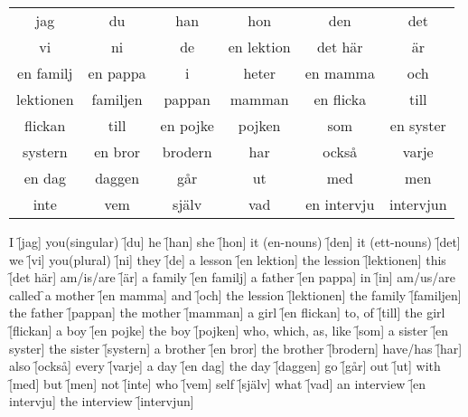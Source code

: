 \begin{center}
    \begin{tabular}{|c c c c c c|}
        \hline
        jag & du & han & hon & den & det \\
        vi & ni & de & en lektion & det här & är \\
        en familj & en pappa & i & heter & en mamma & och \\
        lektionen  & familjen & pappan & mamman & en flicka & till \\
        flickan & till & en pojke & pojken & som & en syster \\
        systern & en bror & brodern & har & också & varje \\
        en dag & daggen & går & ut &  med  &  men \\
        inte & vem & själv & vad & en intervju & intervjun \\
        \hline
    \end{tabular}
\end{center}

\begin{questions}
    \begin{multicols}{2}
        \raggedcolumns
        \question I \f[jag]
        \question you(singular) \f[du]
        \question he \f[han]
        \question she \f[hon]
        \question it (en-nouns) \f[den]
        \question it (ett-nouns) \f[det]
        \question we \f[vi]
        \question you(plural) \f[ni]
        \question they \f[de]
        \question a lesson \f[en lektion]
        \question the lession \f[lektionen]
        \question this \f[det här]
        \question am/is/are \f[är]
        \question a family \f[en familj]
        \question a father \f[en pappa]
        \question in \f[in]
        \question am/us/are called \f
        \question a mother \f[en mamma]
        \question and \f[och]
        \question the lession \f[lektionen]
        \question the family \f[familjen]
        \question the father \f[pappan]
        \question the mother \f[mamman]
        \question a girl \f[en flickan]
        \question to, of \f[till]
        \question the girl \f[flickan]
        \question a boy \f[en pojke]
        \question the boy \f[pojken]
        \question who, which, as, like \f[som]
        \question a sister \f[en syster]
        \question the sister \f[systern]
        \question a brother \f[en bror]
        \question the brother \f[brodern]
        \question have/has \f[har]
        \question also \f[också]
        \question every \f[varje]
        \question a day \f[en dag]
        \question the day \f[daggen]
        \question go \f[går]
        \question out \f[ut]
        \question with \f[med]
        \question but \f[men]
        \question not \f[inte]
        \question who \f[vem]
        \question self \f[själv]
        \question what \f[vad]
        \question an interview \f[en intervju]
        \question the interview \f[intervjun]
    \end{multicols}
\end{questions}